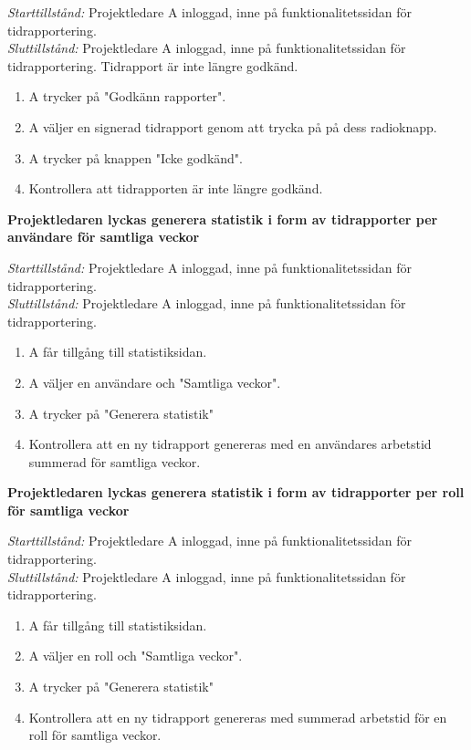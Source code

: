 \documentclass[a4paper]{article}
\begin{document}
\begin{FT}
\emph{Starttillstånd:} Projektledare A inloggad, inne på funktionalitetssidan för tidrapportering.\\
\emph{Sluttillstånd:} Projektledare A inloggad, inne på funktionalitetssidan för tidrapportering. Tidrapport är inte längre godkänd.

\begin{enumerate}
\item A trycker på "Godkänn rapporter".
\item A väljer en signerad tidrapport genom att trycka på på dess radioknapp.
\item A trycker på knappen "Icke godkänd".
\item Kontrollera att tidrapporten är inte längre godkänd.
\end{enumerate}



\item
\textbf{Projektledaren lyckas generera statistik i form av tidrapporter per användare för samtliga veckor}

\emph{Starttillstånd:} Projektledare A inloggad, inne på funktionalitetssidan för tidrapportering.\\
\emph{Sluttillstånd:} Projektledare A inloggad, inne på funktionalitetssidan för tidrapportering.

\begin{enumerate}
\item A får tillgång till statistiksidan.
\item A väljer en användare och "Samtliga veckor".
\item A trycker på "Generera statistik"
\item Kontrollera att en ny tidrapport genereras med en användares arbetstid summerad för samtliga veckor.
\end{enumerate}



\item
\textbf{Projektledaren lyckas generera statistik i form av tidrapporter per roll för samtliga veckor}

\emph{Starttillstånd:} Projektledare A inloggad, inne på funktionalitetssidan för tidrapportering.\\
\emph{Sluttillstånd:} Projektledare A inloggad, inne på funktionalitetssidan för tidrapportering.

\begin{enumerate}
\item A får tillgång till statistiksidan.
\item A väljer en roll och "Samtliga veckor".
\item A trycker på "Generera statistik"
\item Kontrollera att en ny tidrapport genereras med summerad arbetstid för en roll för samtliga veckor.
\end{enumerate}



\end{FT}
\end{document}
